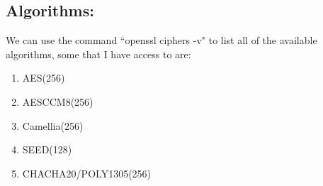 \documentclass{article}
\numberwithin{equation}{subsection}
\begin{document}
	\subsection{Algorithms:}
	We can use the command ``openssl ciphers -v" to list all of the available algorithms, some
	that I have access to are:
	\begin{enumerate}
		\item AES(256) 
		\item AESCCM8(256)
		\item Camellia(256)
		\item SEED(128)
		\item CHACHA20/POLY1305(256)
	\end{enumerate}
\end{document}
